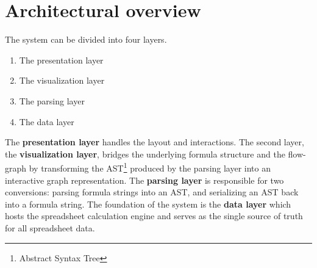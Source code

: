\section{Architectural overview}
The system can be divided into four layers.
\begin{samepage}
    \begin{enumerate}
    \item The presentation layer
    \item The visualization layer
    \item The parsing layer
    \item The data layer
\end{enumerate}
\end{samepage} 
The \textbf{presentation layer} handles the layout and interactions. 
The second layer, the \textbf{visualization layer}, bridges the underlying formula structure and the flow-graph by transforming the AST\footnote{Abstract Syntax Tree} produced by the parsing layer into an interactive graph representation. The \textbf{parsing layer} is responsible for two conversions: parsing formula strings into an AST, and serializing an AST back into a formula string. The foundation of the system is the \textbf{data layer} which hosts the spreadsheet calculation engine and serves as the single source of truth for all spreadsheet data.


